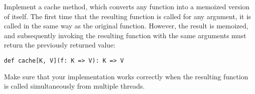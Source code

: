 \documentclass[11pt]{article}
\begin{document}
\begin{myExercise}Implement a cache method, which converts any function into a memoized version of itself. The first time that the resulting function is called for any argument, it is called in the same way as the original function. However, the result is memoized, and subsequently invoking the resulting function with the same arguments must return the previously returned value:
\begin{lstlisting}
def cache[K, V](f: K => V): K => V
\end{lstlisting}
Make sure that your implementation works correctly when the resulting function is called   simultaneously from multiple threads.
\end{myExercise}
\end{document}
